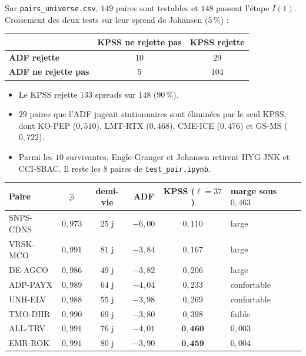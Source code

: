 \documentclass[11pt,a4paper]{article}
\newcommand{\code}[1]{\texttt{#1}}
\theoremstyle{definition}
\begin{document}
Sur \code{pairs\_universe.csv}, $149$ paires sont testables et $148$ passent l'étape $I(1)$. Croisement des deux tests sur leur spread de Johansen ($5\,\%$) :

\begin{center}
\begin{tabular}{@{}lcc@{}}
\toprule
 & KPSS ne rejette pas & KPSS rejette \\
\midrule
\textbf{ADF rejette} & $10$ & $29$ \\
\textbf{ADF ne rejette pas} & $5$ & $104$ \\
\bottomrule
\end{tabular}
\end{center}

\begin{itemize}
\item Le KPSS rejette $133$ spreads sur $148$ ($90\,\%$).
\item $29$ paires que l'ADF jugeait stationnaires sont éliminées par le seul KPSS, dont KO-PEP ($0{,}510$), LMT-RTX ($0{,}468$), CME-ICE ($0{,}476$) et GS-MS ($0{,}722$).
\item Parmi les $10$ survivantes, Engle-Granger et Johansen retirent HYG-JNK et CCI-SBAC. Il reste les $8$ paires de \code{test\_pair.ipynb}.
\end{itemize}

\begin{center}
\begin{tabular}{@{}lccccl@{}}
\toprule
Paire & $\hat\rho$ & demi-vie & ADF & KPSS ($\ell = 37$) & marge sous $0{,}463$ \\
\midrule
SNPS-CDNS & $0{,}973$ & $25$ j & $-6{,}00$ & $0{,}110$ & large \\
VRSK-MCO & $0{,}991$ & $81$ j & $-3{,}84$ & $0{,}167$ & large \\
DE-AGCO & $0{,}986$ & $49$ j & $-3{,}82$ & $0{,}206$ & large \\
ADP-PAYX & $0{,}989$ & $64$ j & $-4{,}04$ & $0{,}233$ & confortable \\
UNH-ELV & $0{,}988$ & $55$ j & $-3{,}98$ & $0{,}269$ & confortable \\
TMO-DHR & $0{,}990$ & $69$ j & $-3{,}80$ & $0{,}398$ & faible \\
ALL-TRV & $0{,}991$ & $76$ j & $-4{,}01$ & $\mathbf{0{,}460}$ & $0{,}003$ \\
EMR-ROK & $0{,}991$ & $80$ j & $-3{,}90$ & $\mathbf{0{,}459}$ & $0{,}004$ \\
\bottomrule
\end{tabular}
\end{center}
\end{document}
